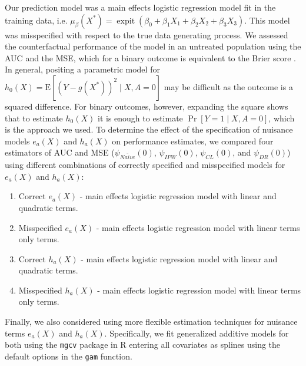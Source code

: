 Our prediction model was a main effects logistic regression model fit in the training data, i.e. $\mu_\beta\left(X^*\right) = \operatorname{expit}(\beta_0 + \beta_1 X_1 + \beta_2 X_2 + \beta_3 X_3)$. This model was misspecified with respect to the true data generating process. We assessed the counterfactual performance of the model in an untreated population using the AUC and the MSE, which for a binary outcome is equivalent to the Brier score \cite{brier_verification_1950}. In general, positing a parametric model for $h_0(X)=\mathrm{E}[(Y-g\left(X^*\right))^2 \mid X, A=0]$ may be difficult as the outcome is a squared difference. For binary outcomes, however, expanding the square shows that to estimate $h_0(X)$ it is enough to estimate $\operatorname{Pr}[Y=1 \mid X, A=0]$, which is the approach we used. To determine the effect of the specification of nuisance models $e_a(X)$ and $h_a(X)$ on performance estimates, we compared four estimators of AUC and MSE (${\psi}_{Na\ddot{i}ve}(0)$, ${\psi}_{IPW}(0)$, ${\psi}_{CL}(0)$, and ${\psi}_{DR}(0)$) using different combinations of correctly specified and misspecified models for $e_a(X)$ and $h_a(X)$:
\begin{enumerate}
    \item Correct $e_a(X)$ - main effects logistic regression model with linear and quadratic terms.
    \item Misspecified $e_a(X)$ - main effects logistic regression model with linear terms only terms.
    \item Correct $h_a(X)$ - main effects logistic regression model with linear and quadratic terms.
    \item Misspecified $h_a(X)$ - main effects logistic regression model with linear terms only terms.
\end{enumerate}
Finally, we also considered using more flexible estimation techniques for nuisance terms $e_a(X)$ and $h_a(X)$. Specifically, we fit generalized additive models for both using the \texttt{mgcv} package in $\mathrm{R}$ entering all covariates as splines using the default options in the \texttt{gam} function.

